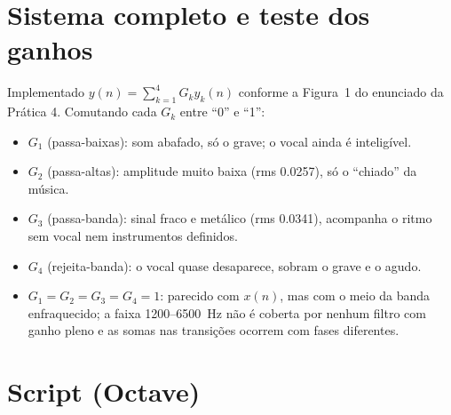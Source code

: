 \documentclass[11pt,a4paper]{article}
\begin{document}
\section{Sistema completo e teste dos ganhos}

Implementado $y(n) = \sum_{k=1}^{4} G_k y_k(n)$ conforme a Figura~1 do enunciado da
Prática 4. Comutando cada $G_k$ entre ``0'' e ``1'':

\begin{itemize}\itemsep0pt
  \item $G_1$ (passa-baixas): som abafado, só o grave; o vocal ainda é inteligível.
  \item $G_2$ (passa-altas): amplitude muito baixa (rms \num{0.0257}), só o ``chiado''
        da música.
  \item $G_3$ (passa-banda): sinal fraco e metálico (rms \num{0.0341}), acompanha o ritmo
        sem vocal nem instrumentos definidos.
  \item $G_4$ (rejeita-banda): o vocal quase desaparece, sobram o grave e o agudo.
  \item $G_1=G_2=G_3=G_4=1$: parecido com $x(n)$, mas com o meio da banda enfraquecido; a
        faixa \SI{1200}{}--\SI{6500}{\hertz} não é coberta por nenhum filtro com ganho
        pleno e as somas nas transições ocorrem com fases diferentes.
\end{itemize}

\section*{Script (Octave)}


\end{document}
